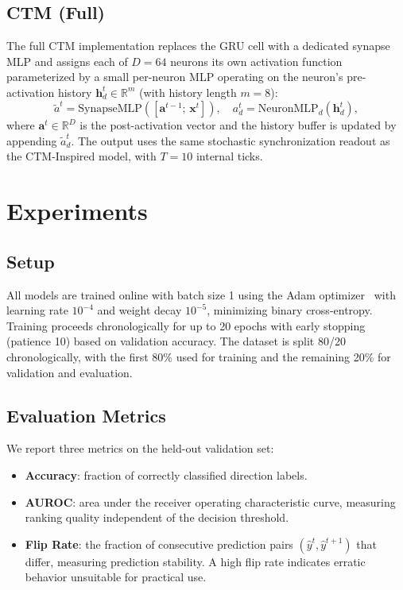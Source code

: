 \documentclass[11pt]{article}
\begin{document}
\subsection{CTM (Full)}

The full CTM implementation replaces the GRU cell with a dedicated synapse
MLP and assigns each of $D = 64$ neurons its own activation function
parameterized by a small per-neuron MLP operating on the neuron's pre-activation
history $\mathbf{h}^t_d \in \mathbb{R}^{m}$ (with history length $m = 8$):
\[
  \tilde{a}^t = \text{SynapseMLP}([\mathbf{a}^{t-1};\, \mathbf{x}^t]),
  \quad a^t_d = \text{NeuronMLP}_d(\mathbf{h}^t_d),
\]
where $\mathbf{a}^t \in \mathbb{R}^{D}$ is the post-activation vector and
the history buffer is updated by appending $\tilde{a}^t_d$. The output
uses the same stochastic synchronization readout as the CTM-Inspired model,
with $T = 10$ internal ticks.

\section{Experiments}
\label{sec:experiments}

\subsection{Setup}

All models are trained online with batch size 1 using the Adam
optimizer~\citep{kingma2015adam} with learning rate $10^{-4}$ and weight
decay $10^{-5}$, minimizing binary cross-entropy. Training proceeds
chronologically for up to 20 epochs with early stopping (patience 10) based
on validation accuracy. The dataset is split 80/20 chronologically, with the
first 80\% used for training and the remaining 20\% for validation and
evaluation.

\subsection{Evaluation Metrics}

We report three metrics on the held-out validation set:
\begin{itemize}
  \item \textbf{Accuracy}: fraction of correctly classified direction labels.
  \item \textbf{AUROC}: area under the receiver operating characteristic
    curve, measuring ranking quality independent of the decision threshold.
  \item \textbf{Flip Rate}: the fraction of consecutive prediction pairs
    $({\hat{y}^t, \hat{y}^{t+1}})$ that differ, measuring prediction stability.
    A high flip rate indicates erratic behavior unsuitable for practical use.
\end{itemize}
\end{document}
